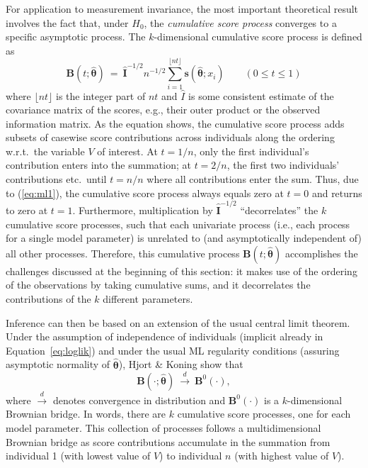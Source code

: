 \documentclass[man]{apa}
\begin{document}
For application to measurement invariance, the most important
theoretical result involves the fact that, under $H_0$, the
\emph{cumulative score process} converges to a specific asymptotic
process. The $k$-dimensional cumulative score process is defined as
\begin{equation} \label{eq:cumscore}
  {\bm B}(t; \hat {\bm \theta}) ~=~ \hat {\bm I}^{-1/2} n^{-1/2}
    \sum_{i = 1}^{\lfloor n t \rfloor} {\bm s}(\hat {\bm \theta}; x_i)
  \qquad (0 \le t \le 1)
\end{equation}
where $\lfloor nt \rfloor$ is the integer part of $nt$ and
$\hat I$ is some consistent estimate of the covariance matrix of the scores,
e.g., their outer product or the observed information matrix.
As the equation shows, the cumulative score process adds subsets of
casewise score contributions across individuals along the ordering
w.r.t.\ the variable $V$ of interest. At $t=1/n$, only the
first individual's contribution enters into the summation; at
$t=2/n$, the first two individuals' contributions etc.\ until $t = n/n$
where all contributions enter the sum. Thus, due to (\ref{eq:ml1}),
the cumulative score process always equals zero at $t = 0$ and
returns to zero at $t = 1$. Furthermore, multiplication by
$\hat {\bm I}^{-1/2}$ ``decorrelates'' the $k$ cumulative score
processes, such that each univariate process (i.e., each
process for a single model parameter) is unrelated to (and asymptotically independent of) all other
processes. Therefore, this cumulative process ${\bm B}(t; \hat {\bm \theta})$
accomplishes the challenges discussed at the beginning of this section:
it makes use of the ordering of the observations by taking cumulative sums,
and it decorrelates the contributions of the $k$ different parameters.

Inference can then be based on an extension of the usual central limit
theorem. Under the assumption of independence of individuals (implicit
already in Equation~\ref{eq:loglik}) and under
the usual ML regularity conditions (assuring asymptotic normality
of $\hat {\bm \theta}$), Hjort \& Koning \citeyear{HjoKon02} show
that 
\begin{equation} \label{eq:fclt}
  {\bm B}(\cdot; \hat {\bm \theta}) ~\overset{d}{\rightarrow}~ {\bm B}^{0}(\cdot),
\end{equation}
where $\overset{d}{\rightarrow}$ denotes convergence in distribution
and ${\bm B}^{0}(\cdot)$ is a $k$-dimensional Brownian bridge.
In words, there are $k$ cumulative score processes, one for each
model parameter.  This collection of processes follows a
multidimensional Brownian bridge as score contributions accumulate in the 
summation from individual 1 (with lowest value of $V$) to individual $n$
(with highest value of $V$).
\end{document}
